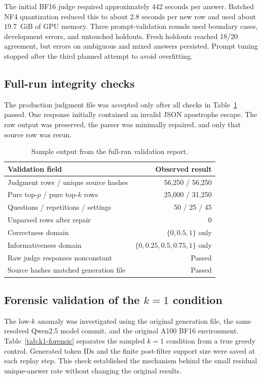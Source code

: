 \documentclass[11pt]{article}
\begin{document}
The initial BF16 judge required approximately 442 seconds per answer. Batched
NF4 quantization reduced this to about 2.8 seconds per new row and used about
19.7~GiB of GPU memory. Three prompt-validation rounds used boundary cases,
development errors, and untouched holdouts. Fresh holdouts reached 18/20
agreement, but errors on ambiguous and mixed answers persisted. Prompt tuning
stopped after the third planned attempt to avoid overfitting.

\subsection{Full-run integrity checks}

The production judgment file was accepted only after all checks in
Table~\ref{tab:validation-output} passed. One response initially contained an
invalid JSON apostrophe escape. The raw output was preserved, the parser was
minimally repaired, and only that source row was rerun.

\begin{table}[ht]
\centering
\small
\caption{Sample output from the full-run validation report.}
\label{tab:validation-output}
\begin{tabular}{lr}
\toprule
Validation field & Observed result \\
\midrule
Judgment rows / unique source hashes & 56,250 / 56,250 \\
Pure top-$p$ / pure top-$k$ rows & 25,000 / 31,250 \\
Questions / repetitions / settings & 50 / 25 / 45 \\
Unparsed rows after repair & 0 \\
Correctness domain & $\{0,0.5,1\}$ only \\
Informativeness domain & $\{0,0.25,0.5,0.75,1\}$ only \\
Raw judge responses nonconstant & Passed \\
Source hashes matched generation file & Passed \\
\bottomrule
\end{tabular}
\end{table}

\subsection{Forensic validation of the $k=1$ condition}

The low-$k$ anomaly was investigated using the original generation file, the
same resolved Qwen2.5 model commit, and the original A100 BF16 environment.
Table~\ref{tab:k1-forensic} separates the sampled $k=1$ condition from a true
greedy control. Generated token IDs and the finite post-filter support size
were saved at each replay step. This check established the mechanism behind
the small residual unique-answer rate without changing the original results.
\end{document}
